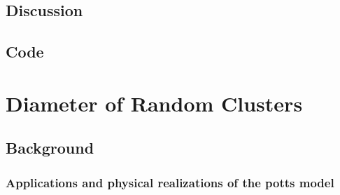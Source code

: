\documentclass{umthesis}
\begin{document}
\section{Discussion}
\label{sec-2.4}
\section{Code}
\label{sec-2.5}
\chapter{Diameter of Random Clusters}
\label{sec-3}
\section{Background}
\label{sec-3.1}
\subsection{Applications and physical realizations of the potts model}
\label{sec-3.1.1}
\end{document}
